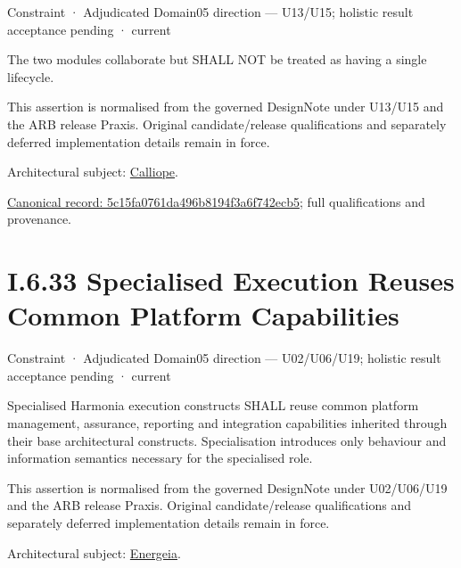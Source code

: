 \label{element:5c15fa0761da496b8194f3a6f742ecb5}
{\small Constraint · Adjudicated Domain05 direction — U13/U15; holistic result acceptance pending · current}\par

The two modules collaborate but SHALL NOT be treated as having a single
lifecycle.



This assertion is normalised from the governed DesignNote under U13/U15 and the ARB release Praxis. Original candidate/release qualifications and separately deferred implementation details remain in force.



Architectural subject: \hyperref[element:466ad8f75a954c0581b5bba090443849]{Calliope}.


{\footnotesize \href{../../../../../../../../continuum/motivation/constraint/5c15fa0761da496b8194f3a6f742ecb5.md}{Canonical record: 5c15fa0761da496b8194f3a6f742ecb5}; full qualifications and provenance.}\par
\section*{I.6.33 Specialised Execution Reuses Common Platform Capabilities}
\label{navigation:I.6.33}

\label{element:968e208d336c48b781a4eabd76e6337b}
{\small Constraint · Adjudicated Domain05 direction — U02/U06/U19; holistic result acceptance pending · current}\par

Specialised Harmonia execution constructs SHALL reuse common platform management, assurance, reporting and integration capabilities inherited through their base architectural constructs. Specialisation introduces only behaviour and information semantics necessary for the specialised role.



This assertion is normalised from the governed DesignNote under U02/U06/U19 and the ARB release Praxis. Original candidate/release qualifications and separately deferred implementation details remain in force.



Architectural subject: \hyperref[element:fb3f37a6ac614415ac486a6de9d35994]{Energeia}.


